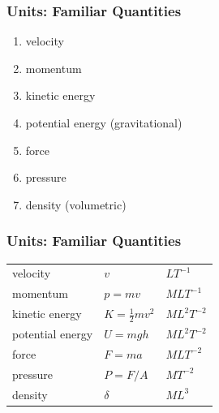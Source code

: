 %
%
\begin{frame}\frametitle{Units: Familiar Quantities}
\begin{enumerate}
	\item velocity
	\item momentum
	\item kinetic energy
	\item potential energy (gravitational)
	\item force
	\item pressure
	\item density (volumetric)
\end{enumerate}
\end{frame}
%
\begin{frame}\frametitle{Units: Familiar Quantities}
\begin{table}[htp]
\begin{center}
	\begin{tabular}{lll}
		velocity & $v$ & $L T^{-1}$ \\[5pt]
		momentum & $p = mv$ & $M L T^{-1}$ \\[5pt]
		kinetic energy & $K=\tfrac{1}{2} m v^{2}$ & $M L^{2} T^{-2}$ \\[5pt]
		potential energy & $U = mgh$ & $M L^{2} T^{-2}$ \\[5pt]
		force & $F = ma$ & $M L T^{-2}$ \\[5pt]
		pressure & $P = F / A$ & $M T^{-2}$ \\[5pt]
		density & $\delta$ & $M L^{3}$ \\[5pt]
	\end{tabular}
\end{center}
\label{tab:units}
\end{table}%
\end{frame}

